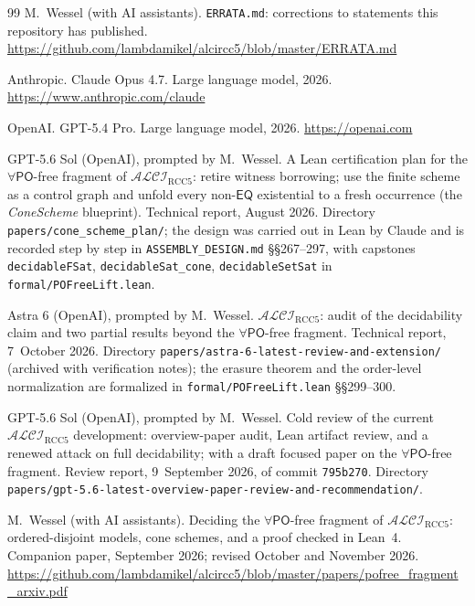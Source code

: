 \documentclass[11pt]{article}
\newcommand{\ALCIRCC}[1]{\mathcal{ALCI}_{\mathrm{RCC#1}}}
\newcommand{\PO}{\mathsf{PO}}
\newcommand{\EQ}{\mathsf{EQ}}
\newcommand{\code}[1]{\texttt{#1}}
\theoremstyle{plain}
\theoremstyle{definition}
\begin{document}
\begin{thebibliography}{99}
M.\ Wessel (with AI assistants).
\newblock \texttt{ERRATA.md}: corrections to statements this repository has
  published.
\newblock \url{https://github.com/lambdamikel/alcircc5/blob/master/ERRATA.md}


Anthropic.
\newblock Claude Opus 4.7.
\newblock Large language model, 2026.
\newblock \url{https://www.anthropic.com/claude}

OpenAI.
\newblock GPT-5.4 Pro.
\newblock Large language model, 2026.
\newblock \url{https://openai.com}

GPT-5.6 Sol (OpenAI), prompted by M.\ Wessel.
\newblock A Lean certification plan for the $\forall\PO$-free fragment of
  $\ALCIRCC{5}$: retire witness borrowing; use the finite scheme as a control
  graph and unfold every non-$\EQ$ existential to a fresh occurrence
  (the \emph{ConeScheme} blueprint).
\newblock Technical report, August 2026.
\newblock Directory
  \texttt{papers/cone\_scheme\_plan/}; the design was carried out in Lean by
  Claude and is recorded step by step in \texttt{ASSEMBLY\_DESIGN.md}
  \S\S267--297, with capstones \code{decidableFSat},
  \code{decidableSat\_cone}, \code{decidableSetSat} in
  \texttt{formal/POFreeLift.lean}.

Astra 6 (OpenAI), prompted by M.\ Wessel.
\newblock $\ALCIRCC{5}$: audit of the decidability claim and two partial
  results beyond the $\forall\PO$-free fragment.
\newblock Technical report, 7~October 2026.
\newblock Directory
  \texttt{papers/astra-6-latest-review-and-extension/} (archived with
  verification notes); the erasure theorem and the order-level normalization
  are formalized in \texttt{formal/POFreeLift.lean} \S\S299--300.

GPT-5.6 Sol (OpenAI), prompted by M.\ Wessel.
\newblock Cold review of the current $\ALCIRCC{5}$ development: overview-paper
  audit, Lean artifact review, and a renewed attack on full decidability;
  with a draft focused paper on the $\forall\PO$-free fragment.
\newblock Review report, 9~September 2026, of commit \texttt{795b270}.
\newblock Directory
  \texttt{papers/gpt-5.6-latest-overview-paper-review-and-recommendation/}.

M.\ Wessel (with AI assistants).
\newblock Deciding the $\forall\PO$-free fragment of $\ALCIRCC{5}$:
  ordered-disjoint models, cone schemes, and a proof checked in Lean~4.
\newblock Companion paper, September 2026; revised October and November
  2026.
\newblock \url{https://github.com/lambdamikel/alcircc5/blob/master/papers/pofree_fragment_arxiv.pdf}


\end{thebibliography}
\end{document}
